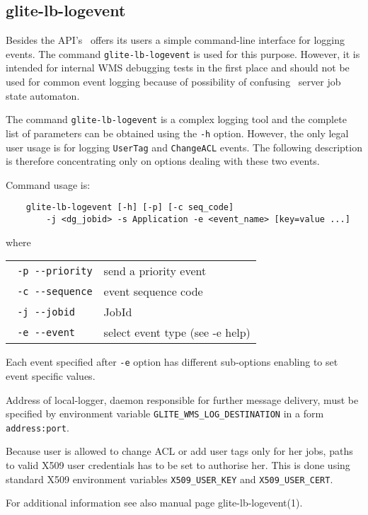 \subsection{glite-lb-logevent}
\label{glite-lb-logevent}

Besides the API's \LB\ offers its users a simple command-line interface for
logging events. The command \verb'glite-lb-logevent' is used for this purpose.
However, it is intended for internal WMS debugging tests in the first place and
should not be used for common event logging because of possibility of confusing
\LB\ server job state automaton.

The command \verb'glite-lb-logevent' is a complex logging tool and the complete
list of parameters can be obtained using the \verb'-h' option.  However,
the only legal user usage is for logging \verb'UserTag' and \verb'ChangeACL'
events. The following description is therefore concentrating only on options
dealing with these two events.

Command usage is:

\begin{verbatim}
    glite-lb-logevent [-h] [-p] [-c seq_code] 
        -j <dg_jobid> -s Application -e <event_name> [key=value ...]
\end{verbatim}

where

\begin{tabularx}{\textwidth}{lX}
\texttt{  -p  -{}-priority} &       send a priority event\\
\texttt{  -c  -{}-sequence} &       event sequence code\\
\texttt{  -j  -{}-jobid} &          JobId\\
\texttt{  -e  -{}-event} &           select event type (see -e help)\\
\end{tabularx}


Each event specified after \verb'-e' option has different sub-options enabling
to set event specific values.

Address of local-logger, daemon responsible for further message delivery, must 
be specified by environment
variable \verb'GLITE_WMS_LOG_DESTINATION' in a form \verb'address:port'.

Because user is allowed to change ACL or add user tags only for her jobs, paths
to valid X509 user credentials has to be set to authorise her. This is done
using standard X509 environment variables \verb'X509_USER_KEY' and
\verb'X509_USER_CERT'.

For additional information see also manual page glite-lb-logevent(1).




